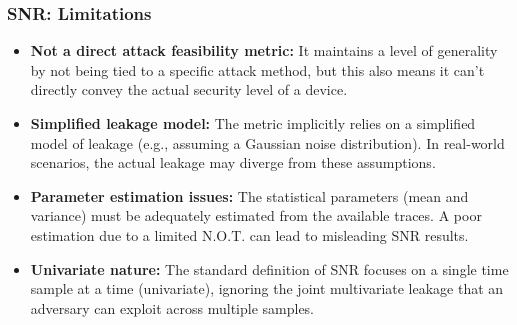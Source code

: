 \begin{frame}
    \frametitle{SNR: Limitations}
    \begin{block}{}
        \begin{itemize}
            \item \textbf{Not a direct attack feasibility metric:} It maintains a level of generality by not being tied to a specific attack method, but this also means it can't directly convey the actual security level of a device.
            \item \textbf{Simplified leakage model:} The metric implicitly relies on a simplified model of leakage (e.g., assuming a Gaussian noise distribution). In real-world scenarios, the actual leakage may diverge from these assumptions.
            \item \textbf{Parameter estimation issues:} The statistical parameters (mean and variance) must be adequately estimated from the available traces. A poor estimation due to a limited N.O.T. can lead to misleading SNR results.
            \item \textbf{Univariate nature:} The standard definition of SNR focuses on a single time sample at a time (univariate), ignoring the joint multivariate leakage that an adversary can exploit across multiple samples. 
        \end{itemize}
    \end{block}
\end{frame}

